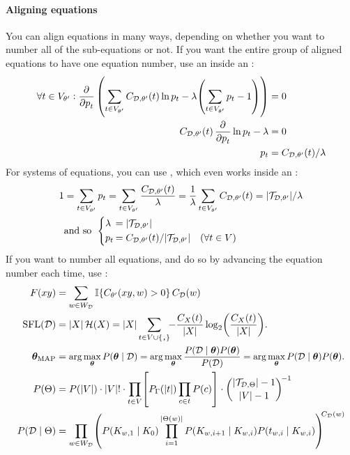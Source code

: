 \paragraph{Aligning equations} You can align equations in many ways, depending on whether you want to number all of the sub-equations or not. If you want the entire group of aligned equations to have one equation number, use an  inside an :
\begin{equation}\begin{aligned}
	\forall t\in V_{\theta'} : \dpd{}{p_t}\left(\sum_{t\in V_{\theta'}} C_{\D,{\theta'}}(t) \ln p_t - \lambda\left( \sum_{t\in V_{\theta'}} p_t - 1 \right) \right) &= 0 \\
	C_{\D,{\theta'}}(t) \dpd{}{p_t}\ln p_t - \lambda &= 0 \\
	p_t &= C_{\D,{\theta'}}(t)/\lambda 
\end{aligned}\end{equation}
For systems of equations, you can use , which even works inside an :
\begin{equation}\label{eq:mle}\begin{aligned}
	1 &= \sum_{t\in V_{\theta'}} p_t = \sum_{t\in V_{\theta'}} \frac{C_{\D,{\theta'}}(t)}{\lambda} = \frac{1}{\lambda}\sum_{t\in V_{\theta'}} C_{\D,{\theta'}}(t) = |\T_{\D,{\theta'}}|/\lambda \\
	&\text{and so }\; \begin{dcases}
		\lambda\hspace{-0.8em} &= |\T_{\D,{\theta'}}| \\
		p_t\hspace{-0.8em} &= C_{\D,{\theta'}}(t)/|\T_{\D,{\theta'}}| \quad(\forall t\in V)
	\end{dcases}
\end{aligned}\end{equation}
If you want to number all equations, and do so by advancing the equation number each time, use :
\begin{align}
	F(xy) &= \sum_{w\in W_\D} \mathbb{I}\{C_{\theta'}(xy,w) > 0\}\, C_\D(w) \label{eq:modulatethis} \\
	\text{SFL}(\D) &= |X|\, \mathcal H(X) = |X|\sum_{t\in V\cup\{\co{,}\}}\!\! - \frac{C_X(t)}{|X|} \log_2\left( \frac{C_X(t)}{|X|} \right). \label{eq:sfl} \\
	\bm\theta_\text{MAP} &= \scalemath{0.95}{\arg\max_{\bm\theta} P(\bm\theta \mid \D) = \arg\max_{\bm\theta} \frac{P(\D \mid \bm\theta)P(\bm\theta)}{P(\D)} = \arg\max_{\bm\theta} P(\D \mid \bm\theta)P(\bm\theta)}. \label{eq:map} \\
	P(\Theta) &= P(|V|)\cdot |V|!\cdot \prod_{t\in V}\left[P_\Gamma(|t|)\prod_{c\in t} P(c)\right] \cdot \binom{|\T_{\D,\Theta}|-1}{|V|-1}^{\!-1} \label{eq:prior} \\
	P(\D\mid \Theta) &= \prod_{w\in W_\D}\left( P(K_{w,1}\mid K_0)\prod_{i=1}^{|\Theta(w)|} P(K_{w,i+1}\mid K_{w,i}) P(t_{w,i} \mid K_{w,i} ) \right)^{\!\!C_\D(w)} \label{eq:hmm}
\end{align}
